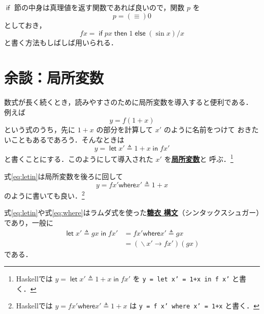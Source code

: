 \documentclass[a5paper,twoside,fleqn,draft]{jsbook}
\newcommand{\programminglanguage}[1]{\textsf{#1}}
\newcommand{\haskell}{\programminglanguage{Haskell}}
\newcommand{\keyword}[1]{{\underline{\textbf{#1}}}}
\newcommand{\code}[1]{\texttt{#1}}
\newcommand{\mKeyword}[1]{\mathsf{#1}} %
\newcommand{\mIfKeyword}{\mKeyword{if}}
\newcommand{\mElseKeyword}{\mKeyword{else}}
\newcommand{\mInKeyword}{\mKeyword{in}}
\newcommand{\mLetKeyword}{\mKeyword{let}}
\newcommand{\mOtherwiseKeyword}{\mKeyword{otherwise}}
\newcommand{\mThenKeyword}{\mKeyword{then}}
\newcommand{\mWhereKeyword}{\mKeyword{where}}
\DeclareMathOperator{\mElse}{\mElseKeyword}
\DeclareMathOperator{\mIf}{\mIfKeyword}
\DeclareMathOperator{\mInKW}{\mInKeyword} %
\DeclareMathOperator{\mLetKW}{\mLetKeyword} %
\DeclareMathOperator{\mOtherwise}{\mOtherwiseKeyword}
\DeclareMathOperator{\mThen}{\mThenKeyword}
\DeclareMathOperator{\mLambda}{\backslash}
\DeclareMathOperator{\mLambdaArrow}{\rightarrow}
\DeclareMathOperator{\mLetEq}{\triangleq}
\newcommand{\mIfThenElse}[3]{\mIf{#1}\mThen{#2}\mElse{#3}}
\newcommand{\mLambdaExp}[2]{\mLambda{#1}\mLambdaArrow{#2}}
\newcommand{\mLetIn}[3]{\mLetKW#1\mLetEq#2\mInKW{#3}}
\newcommand{\mWhereIs}[2]{\mathbin{\mWhereKeyword}#1\mLetEq#2}
\begin{document}
$\mIf$ 節の中身は真理値を返す関数であれば良いので，関数 $p$ を
\begin{equation}
  p=(\equiv)0
\end{equation}
としておき，
\begin{equation}
  fx=\mIfThenElse{px}{1}{{}(\sin x)/x}
\end{equation}
と書く方法もしばしば用いられる．


\section{余談：局所変数}

数式が長く続くとき，読みやすさのために局所変数を導入すると便利である．
例えば
\begin{equation}
  y=f(1+x)
\end{equation}
という式のうち，先に $1+x$ の部分を計算して $x'$ のように名前をつけて
おきたいこともあるであろう．そんなときは
\begin{equation}
  \label{eq:letin}
  y=\mLetIn{x'}{1+x}{fx'}
\end{equation}
と書くことにする．このようにして導入された $x'$ を\keyword{局所変数}と
呼ぶ．\footnote{\haskell では $y=\mLetIn{x'}{1+x}{fx'}$ を \code{y =
    let x' = 1+x in f x'} と書く．}

式\eqref{eq:letin}は局所変数を後ろに回して
\begin{equation}
\label{eq:where}
y=fx'\mWhereIs{x'}{1+x}
\end{equation}
のように書いても良い．\footnote{\haskell では
  $y=fx'\mWhereIs{x'}{1+x}$ は \code{y = f x' where x' = 1+x} と書く．}

式\eqref{eq:letin}や式\eqref{eq:where}はラムダ式を使った\keyword{糖衣
  構文}（シンタックスシュガー）であり，一般に
\begin{align}
\mLetIn{x'}{gx}{fx'}
&=fx'\mWhereIs{x'}{gx}\\ &=(\mLambdaExp{x'}{fx'})(gx)
\end{align}
である．
\end{document}
